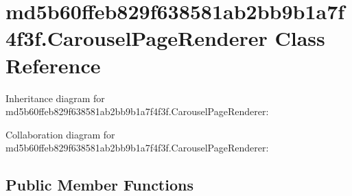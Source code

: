 \hypertarget{classmd5b60ffeb829f638581ab2bb9b1a7f4f3f_1_1_carousel_page_renderer}{}\section{md5b60ffeb829f638581ab2bb9b1a7f4f3f.\+Carousel\+Page\+Renderer Class Reference}
\label{classmd5b60ffeb829f638581ab2bb9b1a7f4f3f_1_1_carousel_page_renderer}


Inheritance diagram for md5b60ffeb829f638581ab2bb9b1a7f4f3f.\+Carousel\+Page\+Renderer\+:


Collaboration diagram for md5b60ffeb829f638581ab2bb9b1a7f4f3f.\+Carousel\+Page\+Renderer\+:
\subsection*{Public Member Functions}

